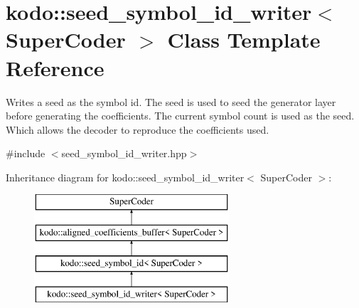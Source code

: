 \hypertarget{classkodo_1_1seed__symbol__id__writer}{\section{kodo\-:\-:seed\-\_\-symbol\-\_\-id\-\_\-writer$<$ Super\-Coder $>$ Class Template Reference}
\label{classkodo_1_1seed__symbol__id__writer}
}


Writes a seed as the symbol id. The seed is used to seed the generator layer before generating the coefficients. The current symbol count is used as the seed. Which allows the decoder to reproduce the coefficients used.  




{\ttfamily \#include $<$seed\-\_\-symbol\-\_\-id\-\_\-writer.\-hpp$>$}

Inheritance diagram for kodo\-:\-:seed\-\_\-symbol\-\_\-id\-\_\-writer$<$ Super\-Coder $>$\-:\begin{figure}[H]
\begin{center}
\leavevmode
\includegraphics[height=4.000000cm]{classkodo_1_1seed__symbol__id__writer}
\end{center}
\end{figure}
